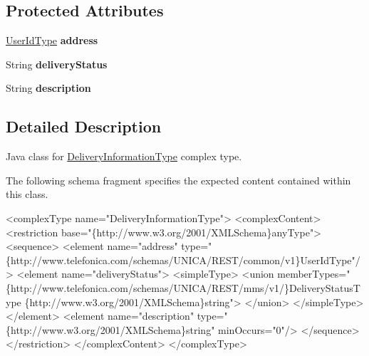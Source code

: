 \subsection*{Protected Attributes}
\begin{DoxyCompactItemize}
\item 
\hypertarget{classcom_1_1telefonica_1_1schemas_1_1unica_1_1rest_1_1mms_1_1v1_1_1DeliveryInformationType_aa6e20f57793be0134a8222019bd5fb16}{
\hyperlink{classcom_1_1telefonica_1_1schemas_1_1unica_1_1rest_1_1common_1_1v1_1_1UserIdType}{UserIdType} {\bfseries address}}
\label{classcom_1_1telefonica_1_1schemas_1_1unica_1_1rest_1_1mms_1_1v1_1_1DeliveryInformationType_aa6e20f57793be0134a8222019bd5fb16}

\item 
\hypertarget{classcom_1_1telefonica_1_1schemas_1_1unica_1_1rest_1_1mms_1_1v1_1_1DeliveryInformationType_aff165eac0663b31a382f1ec9eb248ca8}{
String {\bfseries deliveryStatus}}
\label{classcom_1_1telefonica_1_1schemas_1_1unica_1_1rest_1_1mms_1_1v1_1_1DeliveryInformationType_aff165eac0663b31a382f1ec9eb248ca8}

\item 
\hypertarget{classcom_1_1telefonica_1_1schemas_1_1unica_1_1rest_1_1mms_1_1v1_1_1DeliveryInformationType_a9457b405149c7d8fd911476ab4a2048b}{
String {\bfseries description}}
\label{classcom_1_1telefonica_1_1schemas_1_1unica_1_1rest_1_1mms_1_1v1_1_1DeliveryInformationType_a9457b405149c7d8fd911476ab4a2048b}

\end{DoxyCompactItemize}


\subsection{Detailed Description}
Java class for \hyperlink{classcom_1_1telefonica_1_1schemas_1_1unica_1_1rest_1_1mms_1_1v1_1_1DeliveryInformationType}{DeliveryInformationType} complex type.

The following schema fragment specifies the expected content contained within this class.


\begin{DoxyPre}
 <complexType name="DeliveryInformationType">
   <complexContent>
     <restriction base="\{http://www.w3.org/2001/XMLSchema\}anyType">
       <sequence>
         <element name="address" type="\{http://www.telefonica.com/schemas/UNICA/REST/common/v1\}UserIdType"/>
         <element name="deliveryStatus">
           <simpleType>
             <union memberTypes=" \{http://www.telefonica.com/schemas/UNICA/REST/mms/v1/\}DeliveryStatusType \{http://www.w3.org/2001/XMLSchema\}string">
             </union>
           </simpleType>
         </element>
         <element name="description" type="\{http://www.w3.org/2001/XMLSchema\}string" minOccurs="0"/>
       </sequence>
     </restriction>
   </complexContent>
 </complexType>
 \end{DoxyPre}
 

